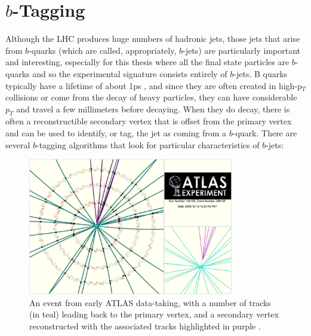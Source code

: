 \section{$b$-Tagging}
\label{sec:b-tag}

Although the LHC produces huge numbers of hadronic jets, those jets that arise from $b$-quarks
(which are called, appropriately, $b$-jets) are particularly important and interesting,
especially for this thesis where all the final state particles are $b$-quarks and so the 
experimental signature consists entirely of $b$-jets.
B quarks typically have a lifetime of about 1ps
, and since they are often created in high-p$_T$ collisions or come from the decay 
of heavy particles, they can have considerable $p_T$ and travel a few millimeters before decaying.
When they do decay, there is often a reconstructible secondary vertex that is offset from
the primary vertex and can be used to identify, or tag, the jet as coming from a $b$-quark.  
There are several $b$-tagging algorithms that look for particular characteristics of $b$-jets:





\begin{figure}
	\includegraphics[width=0.8\textwidth]{ReconstructionPerformance/images/secondary_vertex.pdf}
	\caption{An event from early ATLAS data-taking, with a number of tracks (in teal) leading back to the primary vertex, and a secondary vertex reconstructed with the associated tracks highlighted in purple \cite{sv}.	\label{fig:secondary_vertex}  }
\end{figure}



